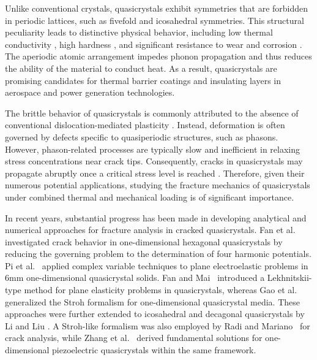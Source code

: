 Unlike conventional crystals, quasicrystals exhibit symmetries that
are forbidden in periodic lattices, such as fivefold and icosahedral
symmetries. This structural peculiarity leads to distinctive physical
behavior, including low thermal conductivity \cite{Kushnir40}, high
hardness \cite{Kushnir41}, and significant resistance to wear and
corrosion \cite{Kushnir42}. The aperiodic atomic arrangement impedes
phonon propagation and thus reduces the ability of the material to
conduct heat. As a result, quasicrystals are promising candidates for
thermal barrier coatings and insulating layers in aerospace and power
generation technologies.

The brittle behavior of quasicrystals is commonly attributed to the
absence of conventional dislocation-mediated plasticity
\cite{Kushnir40}. Instead, deformation is often governed by defects
specific to quasiperiodic structures, such as phasons. However,
phason-related processes are typically slow and inefficient in
relaxing stress concentrations near crack tips. Consequently, cracks
in quasicrystals may propagate abruptly once a critical stress level
is reached \cite{Kushnir39}. Therefore, given their numerous potential
applications, studying the fracture mechanics of quasicrystals under
combined thermal and mechanical loading is of significant importance.

In recent years, substantial progress has been made in developing
analytical and numerical approaches for fracture analysis in cracked
quasicrystals. Fan et al.~\cite{Kushnir5} investigated crack behavior
in one-dimensional hexagonal quasicrystals by reducing the governing
problem to the determination of four harmonic potentials. Pi et
al.~\cite{Kushnir7} applied complex variable techniques to plane
electroelastic problems in 6mm one-dimensional quasicrystal solids.
Fan and Mai~\cite{Kushnir8} introduced a Lekhnitskii-type method for
plane elasticity problems in quasicrystals, whereas Gao et
al.~\cite{Kushnir9} generalized the Stroh formalism for
one-dimensional quasicrystal media. These approaches were further
extended to icosahedral and decagonal quasicrystals by Li and Liu
\cite{Kushnir10,Kushnir11}. A Stroh-like formalism was also employed
by Radi and Mariano~\cite{Kushnir12} for crack analysis, while Zhang
et al.~\cite{Kushnir13} derived fundamental solutions for
one-dimensional piezoelectric quasicrystals within the same framework.

